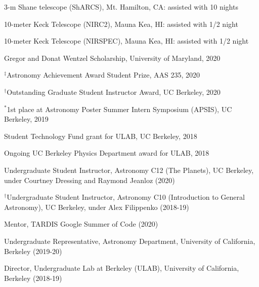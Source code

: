 \documentclass[12pt,letterpaper]{article}
\begin{document}
\begin{list}{}{\cvlist}

\item 3-m Shane telescope (ShARCS), Mt. Hamilton, CA: assisted with 10 nights
\item 10-meter Keck Telescope (NIRC2), Mauna Kea, HI: assisted with 1/2 night
\item 10-meter Keck Telescope (NIRSPEC), Mauna Kea, HI: assisted with 1/2 night

\end{list}

\begin{list}{}{\cvlist}

\item Gregor and Donat Wentzel Scholarship, University of Maryland, 2020
\item $^\ddagger$Astronomy Achievement Award Student Prize, AAS 235, 2020
\item $^\dagger$Outstanding Graduate Student Instructor Award, UC Berkeley, 2020
\item $^*$1st place at Astronomy Poster Summer Intern Symposium (APSIS), UC Berkeley, 2019
\item Student Technology Fund grant for ULAB, UC Berkeley, 2018
\item Ongoing UC Berkeley Physics Department award for ULAB, 2018

\end{list}


\begin{list}{}{\cvlist}
\item Undergraduate Student Instructor, Astronomy C12 (The Planets), UC Berkeley, under Courtney Dressing and Raymond Jeanloz (2020)
\item $^\dagger$Undergraduate Student Instructor, Astronomy C10 (Introduction to General Astronomy), UC Berkeley, under Alex Filippenko (2018-19)
\end{list}

\begin{list}{}{\cvlist}
\item Mentor, TARDIS Google Summer of Code (2020)
\item Undergraduate Representative, Astronomy Department, University of California, Berkeley (2019-20)
\item Director, Undergraduate Lab at Berkeley (ULAB), University of California, Berkeley (2018-19)
\end{list}
\end{document}
